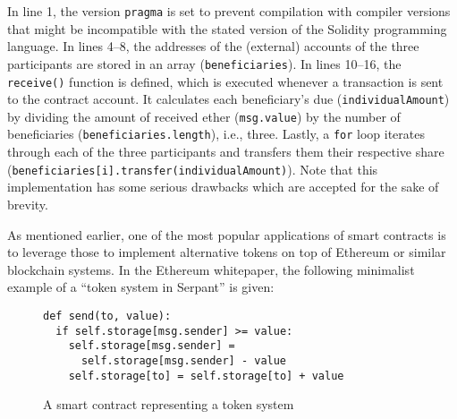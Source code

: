 % 
% 
%     

In line 1, the version \texttt{pragma} is set to prevent compilation with compiler versions that might be incompatible with the stated version of the Solidity programming language.
In lines 4--8, the addresses of the (external) accounts of the three participants are stored in an array (\texttt{beneficiaries}).
In lines 10--16, the \texttt{receive()} function is defined, which is executed whenever a transaction is sent to the contract account.
It calculates each beneficiary's due (\texttt{individualAmount}) by dividing the amount of received ether (\texttt{msg.value}) by the number of beneficiaries (\texttt{beneficiaries.length}), i.e., three.
Lastly, a \texttt{for} loop iterates through each of the three participants and transfers them their respective share (\texttt{beneficiaries[i].transfer(individualAmount)}).
Note that this implementation has some serious drawbacks which are accepted for the sake of brevity.

As mentioned earlier, one of the most popular applications of smart contracts is to leverage those to implement alternative tokens on top of Ethereum or similar blockchain systems.
In the Ethereum whitepaper, the following minimalist example of a ``token system in Serpant'' is given: \autocite[20]{blockchainlab2013ethereumwhitepaper}
\\
\begin{figure}[H]
\begin{lstlisting}
def send(to, value):
  if self.storage[msg.sender] >= value:
    self.storage[msg.sender] =
      self.storage[msg.sender] - value
    self.storage[to] = self.storage[to] + value
\end{lstlisting}
\caption*{A smart contract representing a token system}
\end{figure}

